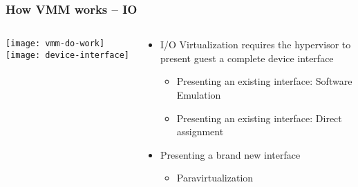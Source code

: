 \begin{frame}[plain]
	\frametitle{How VMM works -- IO}
	
	
	
	\begin{columns}
		
		\begin{column}{.4\textwidth}
			\centering
			\texttt{[image: vmm-do-work]}
			\texttt{[image: device-interface]}
		\end{column}
		
		\begin{column}{.6\textwidth}
			
			\begin{itemize}
				\item I/O Virtualization requires the hypervisor to present guest a complete device interface
				\begin{itemize}
					\item Presenting an existing interface: Software Emulation
					\item Presenting an existing interface: Direct assignment
					
				\end{itemize} 
				\item Presenting a brand new interface
				\begin{itemize}
					\item Paravirtualization
					
				\end{itemize} 
			\end{itemize} 	
			
			
		\end{column}
		
		
	\end{columns}
	
	
\end{frame}

